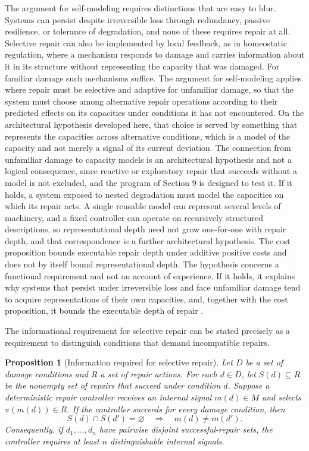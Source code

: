 \documentclass[11pt]{article}
\theoremstyle{definition}
\theoremstyle{plain}
\newtheorem{proposition}{Proposition}
\theoremstyle{remark}
\begin{document}
The argument for self-modeling requires distinctions that are easy to blur. Systems can persist despite irreversible loss through redundancy, passive resilience, or tolerance of degradation, and none of these requires repair at all. Selective repair can also be implemented by local feedback, as in homeostatic regulation, where a mechanism responds to damage and carries information about it in its structure without representing the capacity that was damaged. For familiar damage such mechanisms suffice. The argument for self-modeling applies where repair must be selective and adaptive for unfamiliar damage, so that the system must choose among alternative repair operations according to their predicted effects on its capacities under conditions it has not encountered. On the architectural hypothesis developed here, that choice is served by something that represents the capacities across alternative conditions, which is a model of the capacity and not merely a signal of its current deviation. The connection from unfamiliar damage to capacity models is an architectural hypothesis and not a logical consequence, since reactive or exploratory repair that succeeds without a model is not excluded, and the program of Section 9 is designed to test it. If it holds, a system exposed to nested degradation must model the capacities on which its repair acts. A single reusable model can represent several levels of machinery, and a fixed controller can operate on recursively structured descriptions, so representational depth need not grow one-for-one with repair depth, and that correspondence is a further architectural hypothesis. The cost proposition bounds executable repair depth under additive positive costs and does not by itself bound representational depth. The hypothesis concerns a functional requirement and not an account of experience. If it holds, it explains why systems that persist under irreversible loss and face unfamiliar damage tend to acquire representations of their own capacities, and, together with the cost proposition, it bounds the executable depth of repair \cite{rosen1985}.

The informational requirement for selective repair can be stated precisely as a requirement to distinguish conditions that demand incompatible repairs.

\begin{proposition}[Information required for selective repair]
Let $D$ be a set of damage conditions and $R$ a set of repair actions. For each $d \in D$, let $S(d) \subseteq R$ be the nonempty set of repairs that succeed under condition $d$. Suppose a deterministic repair controller receives an internal signal $m(d) \in M$ and selects $\pi(m(d)) \in R$. If the controller succeeds for every damage condition, then
\[
S(d) \cap S(d') = \varnothing \quad\Longrightarrow\quad m(d) \neq m(d').
\]
Consequently, if $d_1, \ldots, d_n$ have pairwise disjoint successful-repair sets, the controller requires at least $n$ distinguishable internal signals.
\end{proposition}
\end{document}
